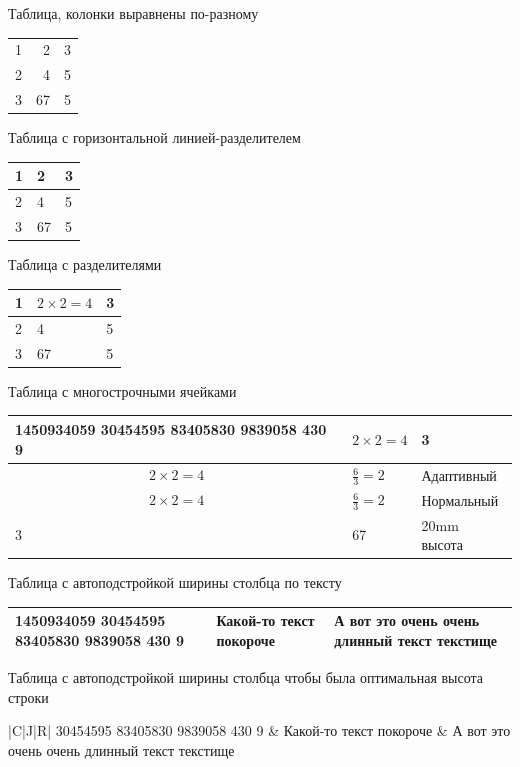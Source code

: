 \documentclass[a4paper,12pt]{article}                       %
\begin{document}
Таблица, колонки выравнены по-разному

\begin{tabular}{lrc}
    1 & 2  & 3 \\
    2 & 4  & 5 \\
    3 & 67 & 5
\end{tabular}

Таблица с горизонтальной линией-разделителем

\begin{tabular}{lll}
    1 & 2  & 3 \\
    \hline
    2 & 4  & 5 \\
    3 & 67 & 5
\end{tabular}

Таблица с разделителями

\begin{tabular}{|l|l|l|}
    \hline
    1 & $2\times2=4$ & 3 \\
    \hline
    2 & 4            & 5 \\
    3 & 67           & 5 \\
    \hline
\end{tabular}

Таблица с многострочными ячейками


\setlength{\extrarowheight}{6mm}
\begin{tabular}{|p{4cm}|l|l|}
    \hline
    1450934059 30454595 83405830 9839058 430 9 & $2\times2=4$                 & 3           \\ [0mm]
    \hline
    \[ 2\times2=4 \]                           & $\frac{6}{3}=2$              & Адаптивный  \\
    \hline
    \[ 2\times2=4 \]                           & $\displaystyle\frac{6}{3}=2$ & Нормальный  \\
    \hline
    3                                          & 67                           & 20mm высота \\ [20mm]
    \hline
\end{tabular}

Таблица с автоподстройкой ширины столбца по тексту

\begin{tabularx}{\textwidth}{|X|X|X|}
    \hline
    1450934059 30454595 83405830 9839058 430 9 & Какой-то текст покороче & А вот это очень очень длинный текст текстище \\
    \hline
\end{tabularx}

Таблица с автоподстройкой ширины столбца чтобы была оптимальная высота строки

\begin{tabulary}{\textwidth}{|C|J|R|}
     30454595 83405830 9839058 430 9 & Какой-то текст покороче & А вот это очень очень длинный текст текстище \\
    \hline
\end{tabulary}
\end{document}
